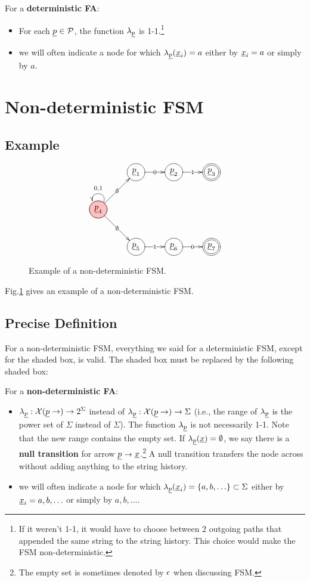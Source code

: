 \begin{mdframed}[hidealllines=true,backgroundcolor=blue!10]
For a {\bf deterministic FA}:
\begin{itemize}
\item For each $\rvp\in\calp$, the function  $\lam_\rvp$ is 1-1.\footnote{If it weren't 1-1,
it would have to choose 
between 2 outgoing paths
that appended the same string to the string history.
This choice would make
the FSM non-deterministic.}

\item
we will often indicate a node for 
which $\lam_{\rvp}(\rvx_i)=a$ either by $\rvx_i=a$
or simply by $a$. 
\end{itemize}\end{mdframed}

\section{Non-deterministic FSM}
\subsection{Example}

\begin{figure}
$$
\xymatrix{
&\Circle{\rvp_1}\ar[r]|0
&\Circle{\rvp_2}\ar[r]|1
&\DCircle{\rvp_3}
\\
\PinkCircle{\rvp_4}\ar@(ru,lu)[]_{0,1}
\ar[ru]|\emptyset
\ar[rd]|\emptyset
\\
&\Circle{\rvp_5}\ar[r]|1
&\Circle{\rvp_6}\ar[r]|0
&\DCircle{\rvp_7}
}
$$
\caption{
Example of a 
non-deterministic FSM.}
\label{fig-non-det-fsm}
\end{figure}
Fig.\ref{fig-non-det-fsm}
gives an example of a non-deterministic
FSM.


\subsection{Precise Definition}
For a non-deterministic FSM,
everything we said for a deterministic FSM,
except for the shaded box, is valid. The shaded 
box must be replaced by the following shaded box:

\begin{mdframed}[hidealllines=true,backgroundcolor=blue!10]
For a {\bf non-deterministic FA}:
\begin{itemize}
\item
$\lam_\rvp:\calx(\rvp\rarrow)\rarrow 2^\Sigma$ 
instead of 
$\lam_\rvp:\calx(\rvp\rarrow)\rarrow \Sigma$ (i.e., the range of $\lam_\rvp$
is the power set of $\Sigma$ 
instead of $\Sigma$).
The function $\lam_\rvp$ is not necessarily
1-1.
Note that the new range contains the empty set.
If $\lam_\rvp(\rvx)=\emptyset$, we say there is a  {\bf null transition} for arrow 
$\rvp\rarrow \rvx$.\footnote{The empty set is sometimes denoted by $\epsilon$ 
when discussing FSM.} A null transition 
transfers the node across without adding anything to the string history. 
\item
we will often indicate a node for 
which $\lam_{\rvp}(\rvx_i)=\{a,b, \ldots\}\subset\Sigma$ either by $\rvx_i=a, b, \ldots$
or simply by $a, b, \ldots$. 
\end{itemize}\end{mdframed}

